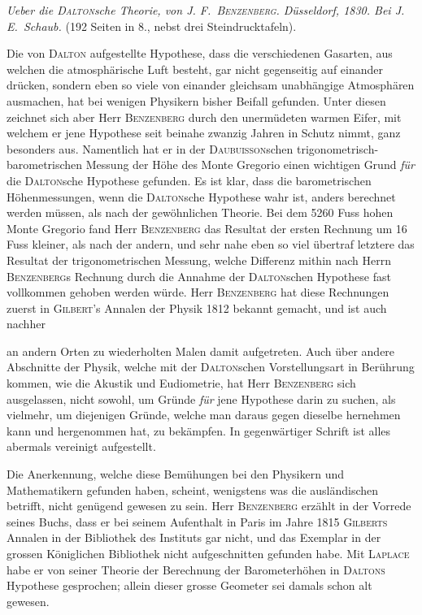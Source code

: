 \textit{Ueber die \textup{\textsc{Dalton}}sche Theorie, von \textup{J. F.\ \textsc{Benzenberg}.} Düsseldorf, \textup{1830.} Bei J. E.\ Schaub.} (192 Seiten in 8., nebst drei Steindrucktafeln).

Die von \textsc{Dalton} aufgestellte Hypothese, dass die verschiedenen Gasarten, aus welchen die atmosphärische Luft besteht, gar nicht gegenseitig auf einander drücken, sondern eben so viele von einander gleichsam unabhängige Atmosphären ausmachen, hat bei wenigen Physikern bisher Beifall gefunden. Unter diesen zeichnet sich aber Herr \textsc{Benzenberg} durch den unermüdeten warmen Eifer, mit welchem er jene Hypothese seit beinahe zwanzig Jahren in Schutz nimmt, ganz besonders aus. Namentlich hat er in der \textsc{Daubuisson}schen trigonometrisch-barometrischen Messung der Höhe des Monte Gregorio einen wichtigen Grund \textit{für} die \textsc{Dalton}sche Hypothese gefunden. Es ist klar, dass die barometrischen Höhenmessungen, wenn die \textsc{Dalton}sche Hypothese wahr ist, anders berechnet werden müssen, als nach der gewöhnlichen Theorie. Bei dem 5260 Fuss hohen Monte Gregorio fand Herr \textsc{Benzenberg} das Resultat der ersten Rechnung um 16 Fuss kleiner, als nach der andern, und sehr nahe eben so viel übertraf letztere das Resultat der trigonometrischen Messung, welche Differenz mithin nach Herrn \textsc{Benzenberg}s Rechnung durch die Annahme der \textsc{Dalton}schen Hypothese fast vollkommen gehoben werden würde. Herr \textsc{Benzenberg} hat diese Rechnungen zuerst in \textsc{Gilbert}'s Annalen der Physik 1812 bekannt gemacht, und ist auch nachher
\par\clearpage
{}
\noindent an andern Orten zu wiederholten Malen damit aufgetreten. Auch über andere Abschnitte der Physik, welche mit der \textsc{Dalton}schen Vorstellungsart in Berührung kommen, wie die Akustik und Eudiometrie, hat Herr \textsc{Benzenberg} sich ausgelassen, nicht sowohl, um Gründe \textit{für} jene Hypothese darin zu suchen, als vielmehr, um diejenigen Gründe, welche man daraus gegen dieselbe hernehmen kann und hergenommen hat, zu bekämpfen. In gegenwärtiger Schrift ist alles abermals vereinigt aufgestellt.

Die Anerkennung, welche diese Bemühungen bei den Physikern und Mathematikern gefunden haben, scheint, wenigstens was die ausländischen betrifft, nicht genügend gewesen zu sein. Herr \textsc{Benzenberg} erzählt in der Vorrede seines Buchs, dass er bei seinem Aufenthalt in Paris im Jahre 1815 \textsc{Gilberts} Annalen in der Bibliothek des Instituts gar nicht, und das Exemplar in der grossen Königlichen Bibliothek nicht aufgeschnitten gefunden habe. Mit \textsc{Laplace} habe er von seiner Theorie der Berechnung der Barometerhöhen in \textsc{Daltons} Hypothese gesprochen; allein dieser grosse Geometer sei damals schon alt gewesen.


